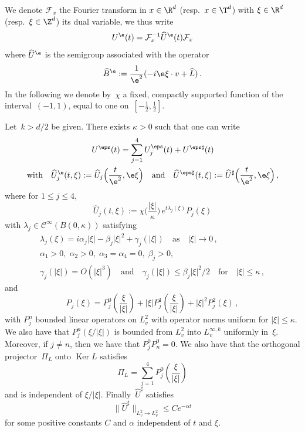 We denote $\mathcal{F}_x$ the Fourier transform in $x \in \R^d$ (resp.~$x \in \T^d$) with $\xi \in \R^d$ (resp.~$\xi \in \Z^d$) its dual variable, we thus write
\[
U^\e(t) = \mathcal{F}_x^{-1} \widehat U^\e(t) \mathcal{F}_x
\]
where $\widehat U^\e$ is the semigroup associated with the operator
\[
\widehat B^\e:=\frac{1}{\e^2}(-i\e \xi \cdot v +\widehat L)\,.
\]
In the following we denote by~$\chi$ a fixed, compactly supported function of the interval~$(-1,1)$, equal to one on~$[-\frac12, \frac12]$.
\begin{lemm} \label{EllisPinsky}
Let~${k>d/2}$ be given. There exists $\kappa>0$ such that one can write
\begin{multline}\label{decompUeps}
U^\eps(t) =\sum_{j=1}^4 U^\eps_j(t) + U^{\eps\sharp}(t) \\
\text{with} \quad \widehat U_j^\e(t,\xi): = \widehat U _j\Big(\frac{t}{\e^2},\e \xi\Big) \quad \text{and}\quad \widehat U^{\eps\sharp}(t,\xi):= \widehat U^{\sharp}\Big(\frac{t}{\e^2},\e \xi\Big) \,,
\end{multline}
where for $1 \le j \le 4$,
\[
\widehat U _j(t,\xi) := \chi\Big(\frac{|\xi|}\kappa\Big) \, e^{t \lambda_j(\xi)} P_j(\xi)
\]
with $\lambda_j \in \mathcal{C}^\infty(B(0,\kappa))$ satisfying
\begin{equation}\label{estimatelambdaj}
\begin{gathered}
\lambda_j(\xi) = i \alpha_j |\xi| - \beta_j|\xi|^2 + \gamma_j(|\xi|) \quad\text{as} \quad |\xi|\to 0
\,,\\
\alpha_1>0,\;\alpha_2>0,\;\alpha_3= \alpha_4=0,\;\beta_j>0 , \\ \gamma_j(|\xi|) =O(|\xi|^3) 
\quad\text{and}\quad \gamma_j(|\xi|) \le \beta_j |\xi|^2/2\quad \text{for} \quad |\xi|\le \kappa\,,
\end{gathered}
\end{equation}
and
\[
P_j(\xi) = P_{j}^0\left(\frac{\xi}{|\xi|}\right) +|\xi| P_{j}^1\left(\frac{\xi}{|\xi|}\right) + |\xi|^2 P_{j}^2(\xi)\,,
\]
with $P_{j}^n$ bounded linear operators on $L^2_v$ with operator norms uniform for $|\xi| \le \kappa$. We also have that $P_{j}^n(\xi/|\xi|)$ is bounded from $L^2_v$ into $L^{\infty,k}_v$ uniformly in~$\xi$. Moreover, if $j \neq n$, then we have that $P^0_j P^0_n=0$. We also have that the orthogonal projector~$\Pi_{L} $ onto $\operatorname{Ker} L$ satisfies
\[
\Pi_{L} = \sum_{j=1}^4 P_{j}^0\left(\frac{\xi}{|\xi|}\right)
\]
and is independent of $\xi/|\xi|$. Finally~$ \widehat U^\sharp$ satisfies
\begin{equation}\label{rateUsharp}
\big\|\widehat U^\sharp \big\|_{L^2_v \to L^2_v} \le C e^{-\alpha t}
\end{equation}
for some positive constants $C$ and $\alpha$ independent of $t$ and $\xi$.
\end{lemm}

